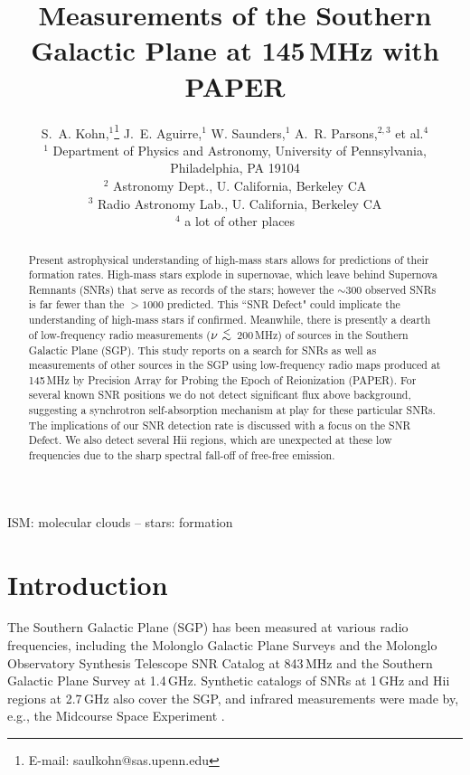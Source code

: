 \documentclass[useAMS,usenatbib]{mn2e}
\title[The SGP at 145\,MHz with PAPER]{Measurements of the Southern Galactic Plane at 145\,MHz with PAPER}
\author[S. A. Kohn et al.]{S.~A. Kohn,$^{1}$\thanks{E-mail: saulkohn@sas.upenn.edu} J.~E. Aguirre,$^{1}$ W. Saunders,$^{1}$
A.~R. Parsons,$^{2,3}$
\newauthor et al.$^4$\\
$^{1}$ Department of Physics and Astronomy, University of Pennsylvania, Philadelphia, PA 19104\\
$^{2}$ Astronomy Dept., U. California, Berkeley CA\\
$^{3}$ Radio Astronomy Lab., U. California, Berkeley CA\\
$^{4}$ a lot of other places\\
}
\newcommand {\aplt} {\ {\raise-.5ex\hbox{$\buildrel<\over\sim$}}\ }
\begin{document}
\date{}

\maketitle
\begin{abstract}
Present astrophysical understanding of high-mass stars allows for predictions of their formation rates.  High-mass stars explode in supernovae, which leave behind Supernova Remnants (SNRs) that serve as records of the stars; however the $\sim$300 observed SNRs is far fewer than the $>1000$ predicted.  This ``SNR Defect" could implicate the understanding of high-mass stars if confirmed. 
Meanwhile, there is presently a dearth of low-frequency radio measurements ($\nu\aplt$200\,MHz) of sources in the Southern Galactic Plane (SGP).
This study reports on a search for SNRs as well as measurements of other sources in the SGP using low-frequency radio maps produced at 145\,MHz by Precision Array for Probing the Epoch of Reionization (PAPER).
For several known SNR positions we do not detect significant flux above background, suggesting a synchrotron self-absorption mechanism at play for these particular SNRs. The implications of our SNR detection rate is discussed with a focus on the SNR Defect. We also detect several H{\sc ii} regions, which are unexpected at these low frequencies due to the sharp spectral fall-off of free-free emission. 
\end{abstract}

\begin{keywords}
ISM: molecular clouds -- stars: formation
\end{keywords}

\section{Introduction}
\label{sec:intro}
The Southern Galactic Plane (SGP) has been measured at various radio frequencies, including the Molonglo Galactic Plane Surveys \citep[MGPS-1 and 2;][]{Green.99,Murphy.07} and the Molonglo Observatory Synthesis Telescope SNR Catalog \citep[MOSTSNRCAT;][]{Whiteoak.96} at 843\,MHz and the Southern Galactic Plane Survey \citep[SGPS;][]{Haverkorn.06} at 1.4\,GHz. Synthetic catalogs of SNRs at 1\,GHz \citep[][hereafter G14]{DAGreen.14} and H{\sc ii} regions at 2.7\,GHz \citep{Paladini.03} also cover the SGP, and infrared measurements were made by, e.g., the Midcourse Space Experiment \citep[MSX;][operating at 8.28--21.3\,$\mu$m (36.23--14.08\,THz)]{Egan.03}. 
\end{document}
